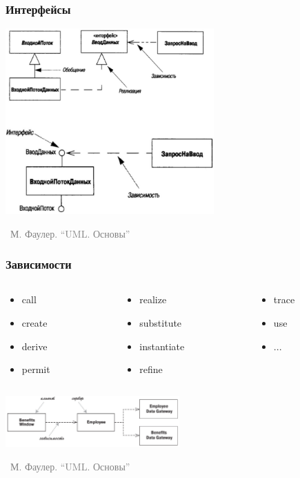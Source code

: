 \documentclass[xetex,mathserif,serif]{beamer}
\newcommand{\attribution}[1] {
	\vspace{-5mm}\begin{flushright}\begin{scriptsize}\textcolor{gray}{\textcopyright\, #1}\end{scriptsize}\end{flushright}
}
\begin{document}
	\begin{frame}
		\frametitle{Интерфейсы}
		\begin{center}
			\includegraphics[width=0.6\textwidth]{interfaces.png}
			\attribution{М. Фаулер. ``UML. Основы''}
		\end{center}
	\end{frame}

	\begin{frame}
		\frametitle{Зависимости}
		\begin{columns}
			\begin{column}{0.3\textwidth}
				\begin{itemize}
					\item call
					\item create
					\item derive
					\item permit 
				\end{itemize}
			\end{column}
			\begin{column}{0.3\textwidth}
				\begin{itemize}
					\item realize
					\item substitute
					\item instantiate
					\item refine 
				\end{itemize}
			\end{column}
			\begin{column}{0.3\textwidth}
				\begin{itemize}
					\item trace
					\item use
					\item ...
				\end{itemize}
			\end{column}
		\end{columns}
		\vspace{7mm}
		\begin{center}
			\includegraphics[width=0.5\textwidth]{dependencies.png}
			\attribution{М. Фаулер. ``UML. Основы''}
		\end{center}
	\end{frame}
\end{document}
